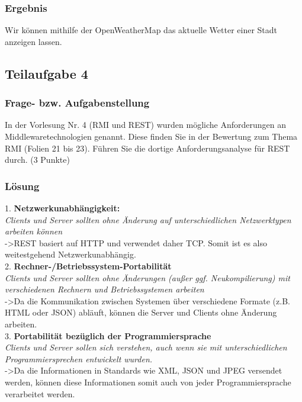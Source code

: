 \subsubsection{Ergebnis}

Wir können mithilfe der OpenWeatherMap das aktuelle Wetter einer Stadt anzeigen lassen.

\subsection{Teilaufgabe 4}

\subsubsection{Frage- bzw. Aufgabenstellung}
In der Vorlesung Nr. 4 (RMI und REST) wurden mögliche Anforderungen an Middlewaretechnologien genannt. Diese ﬁnden Sie in der Bewertung zum Thema RMI (Folien 21 bis 23). Führen Sie die dortige Anforderungsanalyse für REST durch. (3 Punkte)

\subsubsection{Lösung}

1. \textbf{Netzwerkunabhängigkeit:} \\
	\textit{Clients und Server sollten ohne Änderung auf unterschiedlichen Netzwerktypen arbeiten können} \\
	->REST basiert auf HTTP und verwendet daher TCP. Somit ist es also weitestgehend Netzwerkunabhängig. \\
	
2. \textbf{Rechner-/Betriebssystem-Portabilität} \\
	\textit{Clients und Server sollten ohne Änderungen (außer ggf. Neukompilierung) mit verschiedenen Rechnern und Betriebssystemen arbeiten} \\
	->Da die Kommunikation zwischen Systemen über verschiedene Formate (z.B. HTML oder JSON) abläuft, können die Server und Clients ohne Änderung arbeiten. \\
	
3. \textbf{Portabilität bezüglich der Programmiersprache} \\
	\textit{Clients und Server sollen sich verstehen, auch wenn sie mit unterschiedlichen Programmiersprechen entwickelt wurden.} \\
	->Da die Informationen in Standards wie XML, JSON und JPEG versendet werden, können diese Informationen somit auch von jeder Programmiersprache verarbeitet werden. \\
	
